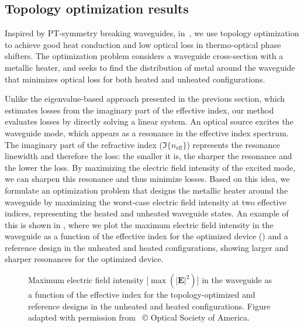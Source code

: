 \subsection*{Topology optimization results~\cite{ownpub0}}

Inspired by PT-symmetry breaking waveguides, in~\cite{ownpub0}, we use topology optimization to achieve good heat conduction and low optical loss in thermo-optical phase shifters.
The optimization problem considers a waveguide cross-section with a metallic heater, and seeks to find the distribution of metal around the waveguide that minimizes optical loss for both heated and 
unheated configurations. 

Unlike the eigenvalue-based approach presented in the previous section, which estimates losses from the imaginary part of the effective index,
 our method evaluates losses by directly solving a linear system. An optical source excites the waveguide mode, which appears
  as a resonance in the effective index spectrum. The imaginary part of the refractive index ($\Im\{n_\text{eff}\}$) represents the resonance linewidth and therefore the loss:
   the smaller it is, the sharper the resonance and the lower the loss. By maximizing the electric field intensity of the excited mode,
    we can sharpen this resonance and thus minimize losses. Based on this idea, we formulate an optimization problem that designs
     the metallic heater around the waveguide by maximizing the worst-case electric field intensity at two effective indices, representing
      the heated and unheated waveguide states. An example of this is shown in , where we plot the maximum electric field intensity in the waveguide as a function of 
      the effective index for the optimized device () and a reference design in the unheated and heated configurations, showing larger and sharper resonances 
      for the optimized device.
 
      \begin{figure}[b]
         \centering
         \caption{Maximum electric field intensity [$\max(\vert \mathbf{E} \vert^2)$] in the waveguide as a function of the effective index for the topology-optimized and reference designs in the unheated and heated
         configurations. Figure adapted with permission from~\cite{ownpub0} © Optical Society of America.}
         \label{fig:therm_opt_neff}
      \end{figure}
      

